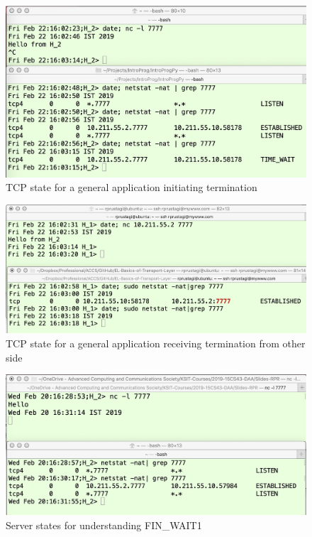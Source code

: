 \begin{figure}[!htb]
\centering
\includegraphics[scale=.25]{src/Figures/chap3/3.jpg}
\caption{TCP state for a general application initiating termination}\label{chap3-fig3}
\end{figure}

\begin{figure}[!htb]
\centering
\includegraphics[scale=.47]{src/Figures/chap3/4.jpg}
\caption{TCP state for a general application receiving termination from other side}\label{chap3-fig4}
\end{figure}

\begin{figure}[!htb]
\centering
\includegraphics[scale=.27]{src/Figures/chap3/5.jpg}
\caption{Server states for understanding FIN\_WAIT1}\label{chap3-fig5}
\end{figure}

